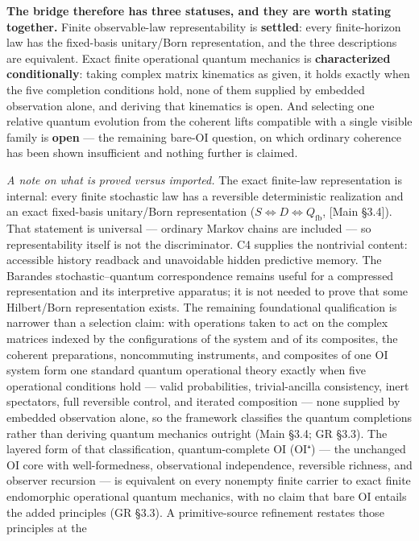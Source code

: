 \documentclass[
]{article}
\begin{document}
\textbf{The bridge therefore has three statuses, and they are worth
stating together.} Finite observable-law representability is
\textbf{settled}: every finite-horizon law has the fixed-basis
unitary/Born representation, and the three descriptions are equivalent.
Exact finite operational quantum mechanics is \textbf{characterized
conditionally}: taking complex matrix kinematics as given, it holds
exactly when the five completion conditions hold, none of them supplied
by embedded observation alone, and deriving that kinematics is open. And
selecting one relative quantum evolution from the coherent lifts
compatible with a single visible family is \textbf{open} --- the
remaining bare-OI question, on which ordinary coherence has been shown
insufficient and nothing further is claimed.

\emph{A note on what is proved versus imported.} The exact finite-law
representation is internal: every finite stochastic law has a reversible
deterministic realization and an exact fixed-basis unitary/Born
representation (\(S \iff D \iff Q_{\mathrm{fb}}\), {[}Main §3.4{]}).
That statement is universal --- ordinary Markov chains are included ---
so representability itself is not the discriminator. C4 supplies the
nontrivial content: accessible history readback and unavoidable hidden
predictive memory. The Barandes stochastic--quantum correspondence
remains useful for a compressed representation and its interpretive
apparatus; it is not needed to prove that some Hilbert/Born
representation exists. The remaining foundational qualification is
narrower than a selection claim: with operations taken to act on the
complex matrices indexed by the configurations of the system and of its
composites, the coherent preparations, noncommuting instruments, and
composites of one OI system form one standard quantum operational theory
exactly when five operational conditions hold --- valid probabilities,
trivial-ancilla consistency, inert spectators, full reversible control,
and iterated composition --- none supplied by embedded observation
alone, so the framework classifies the quantum completions rather than
deriving quantum mechanics outright (Main §3.4; GR §3.3). The layered
form of that classification, quantum-complete OI (OI⁺) --- the unchanged
OI core with well-formedness, observational independence, reversible
richness, and observer recursion --- is equivalent on every nonempty
finite carrier to exact finite endomorphic operational quantum
mechanics, with no claim that bare OI entails the added principles (GR
§3.3). A primitive-source refinement restates those principles at the
\end{document}
